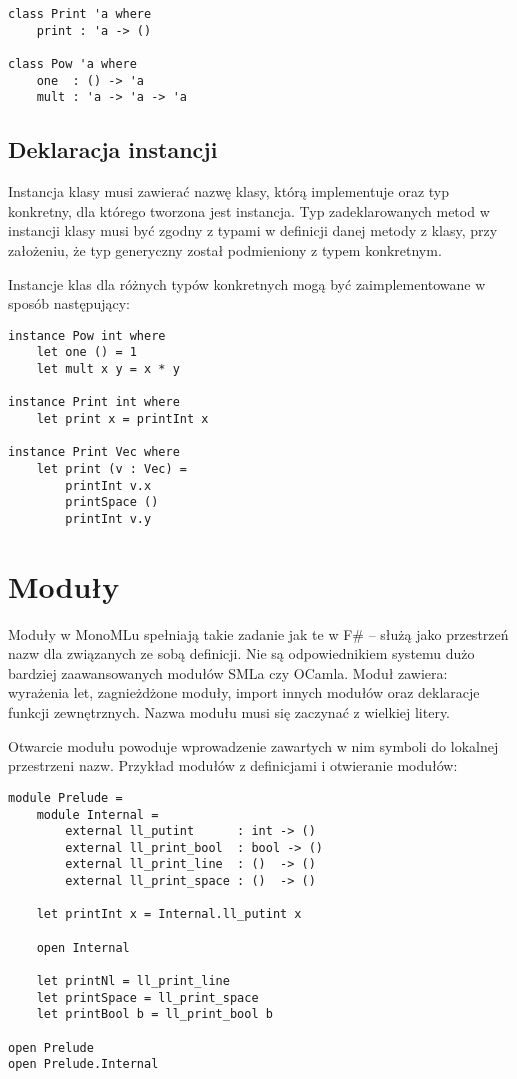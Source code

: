 \documentclass[declaration,shortabstract]{iithesis}
\begin{document}
\begin{lstlisting}[frame=lines]
class Print 'a where 
    print : 'a -> ()
  
class Pow 'a where 
    one  : () -> 'a
    mult : 'a -> 'a -> 'a
\end{lstlisting}

\subsection{Deklaracja instancji}

Instancja klasy musi zawierać nazwę klasy, którą implementuje oraz typ konkretny,
dla którego tworzona jest instancja. Typ zadeklarowanych metod w
instancji klasy musi być zgodny z typami w definicji danej metody z klasy,
przy założeniu, że typ generyczny został podmieniony z typem konkretnym. 

Instancje klas dla różnych typów konkretnych 
mogą być zaimplementowane w sposób następujący:

\begin{lstlisting}[frame=lines]
instance Pow int where
    let one () = 1 
    let mult x y = x * y

instance Print int where 
    let print x = printInt x 

instance Print Vec where 
    let print (v : Vec) = 
        printInt v.x 
        printSpace ()
        printInt v.y
\end{lstlisting}

\section{Moduły}

Moduły w MonoMLu spełniają takie zadanie jak te w F\# -- służą jako 
przestrzeń nazw dla związanych ze sobą definicji. Nie są odpowiednikiem 
systemu dużo bardziej zaawansowanych modułów SMLa czy OCamla.
Moduł zawiera: wyrażenia let, zagnieżdżone moduły, import innych 
modułów oraz deklaracje funkcji zewnętrznych. Nazwa modułu musi się zaczynać 
z wielkiej litery. 

Otwarcie modułu powoduje wprowadzenie zawartych w nim symboli do 
lokalnej przestrzeni nazw. Przykład modułów z definicjami 
i otwieranie modułów:

\begin{lstlisting}[frame=lines]
module Prelude = 
    module Internal = 
        external ll_putint      : int -> () 
        external ll_print_bool  : bool -> () 
        external ll_print_line  : ()  -> () 
        external ll_print_space : ()  -> () 

    let printInt x = Internal.ll_putint x

    open Internal 
    
    let printNl = ll_print_line
    let printSpace = ll_print_space
    let printBool b = ll_print_bool b

open Prelude
open Prelude.Internal
\end{lstlisting}
\end{document}
